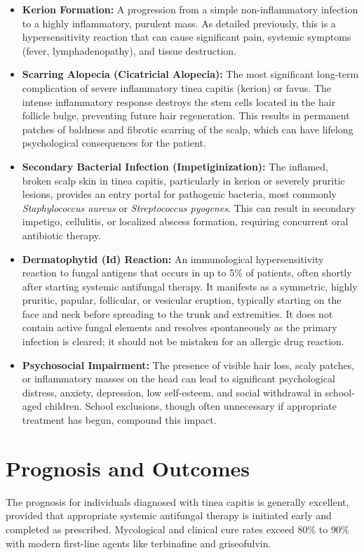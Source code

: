 \begin{itemize}
    \item \textbf{Kerion Formation:} A progression from a simple non-inflammatory infection to a highly inflammatory, purulent mass. As detailed previously, this is a hypersensitivity reaction that can cause significant pain, systemic symptoms (fever, lymphadenopathy), and tissue destruction.
    \item \textbf{Scarring Alopecia (Cicatricial Alopecia):} The most significant long-term complication of severe inflammatory tinea capitis (kerion) or favus. The intense inflammatory response destroys the stem cells located in the hair follicle bulge, preventing future hair regeneration. This results in permanent patches of baldness and fibrotic scarring of the scalp, which can have lifelong psychological consequences for the patient.
    \item \textbf{Secondary Bacterial Infection (Impetiginization):} The inflamed, broken scalp skin in tinea capitis, particularly in kerion or severely pruritic lesions, provides an entry portal for pathogenic bacteria, most commonly \textit{Staphylococcus aureus} or \textit{Streptococcus pyogenes}. This can result in secondary impetigo, cellulitis, or localized abscess formation, requiring concurrent oral antibiotic therapy.
    \item \textbf{Dermatophytid (Id) Reaction:} An immunological hypersensitivity reaction to fungal antigens that occurs in up to 5\% of patients, often shortly after starting systemic antifungal therapy. It manifests as a symmetric, highly pruritic, papular, follicular, or vesicular eruption, typically starting on the face and neck before spreading to the trunk and extremities. It does not contain active fungal elements and resolves spontaneously as the primary infection is cleared; it should not be mistaken for an allergic drug reaction.
    \item \textbf{Psychosocial Impairment:} The presence of visible hair loss, scaly patches, or inflammatory masses on the head can lead to significant psychological distress, anxiety, depression, low self-esteem, and social withdrawal in school-aged children. School exclusions, though often unnecessary if appropriate treatment has begun, compound this impact.
\end{itemize}

\section*{Prognosis and Outcomes}
The prognosis for individuals diagnosed with tinea capitis is generally excellent, provided that appropriate systemic antifungal therapy is initiated early and completed as prescribed. Mycological and clinical cure rates exceed 80\% to 90\% with modern first-line agents like terbinafine and griseofulvin.


